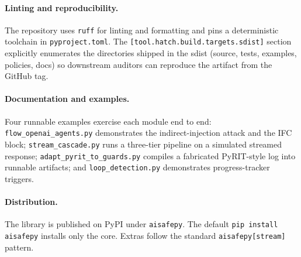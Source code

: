 \paragraph{Linting and reproducibility.} The repository uses
\texttt{ruff} for linting and formatting and pins a deterministic
toolchain in \texttt{pyproject.toml}. The
\texttt{[tool.hatch.build.targets.sdist]} section explicitly enumerates
the directories shipped in the sdist (source, tests, examples,
policies, docs) so downstream auditors can reproduce the artifact
from the GitHub tag.

\paragraph{Documentation and examples.} Four runnable examples
exercise each module end to end:
\texttt{flow\_\allowbreak openai\_\allowbreak agents.py}
demonstrates the indirect-injection attack and the IFC block;
\texttt{stream\_\allowbreak cascade.py} runs a three-tier
pipeline on a simulated streamed response;
\texttt{adapt\_\allowbreak pyrit\_\allowbreak to\_\allowbreak guards.py}
compiles a fabricated PyRIT-style log into runnable artifacts; and
\texttt{loop\_\allowbreak detection.py} demonstrates progress-tracker
triggers.

\paragraph{Distribution.} The library is published on PyPI under
\texttt{aisafepy}. The default \texttt{pip install aisafepy}
installs only the core. Extras follow the standard
\texttt{aisafepy[stream]} pattern.
